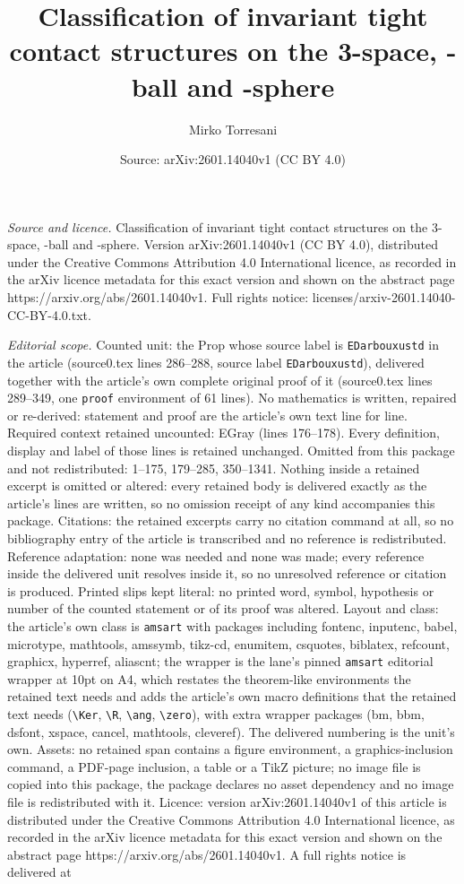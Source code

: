 \documentclass[10pt,a4paper]{amsart}
\title[Classification of invariant tight contact structures on the ]{Classification of invariant tight contact structures on the 3-space, -ball and -sphere}
\author{Mirko Torresani}
\date{Source: arXiv:2601.14040v1 (CC BY 4.0)}
\begin{document}
\maketitle

\noindent\emph{Source and licence.} Classification of invariant tight contact structures on the 3-space, -ball and -sphere. Version arXiv:2601.14040v1 (CC BY 4.0), distributed under the Creative Commons Attribution 4.0 International licence, as recorded in the arXiv licence metadata for this exact version and shown on the abstract page https://arxiv.org/abs/2601.14040v1. Full rights notice: licenses/arxiv-2601.14040-CC-BY-4.0.txt.\par\smallskip

\noindent\textit{Editorial scope.} Counted unit: the Prop whose source label is \texttt{EDarbouxustd} in the article (source0.tex lines 286--288, source label \texttt{EDarbouxustd}), delivered together with the article's own complete original proof of it (source0.tex lines 289--349, one \texttt{proof} environment of 61 lines). No mathematics is written, repaired or re-derived: statement and proof are the article's own text line for line. Required context retained uncounted: EGray (lines 176--178). Every definition, display and label of those lines is retained unchanged. Omitted from this package and not redistributed: 1--175, 179--285, 350--1341. Nothing inside a retained excerpt is omitted or altered: every retained body is delivered exactly as the article's lines are written, so no omission receipt of any kind accompanies this package. Citations: the retained excerpts carry no citation command at all, so no bibliography entry of the article is transcribed and no reference is redistributed. Reference adaptation: none was needed and none was made; every reference inside the delivered unit resolves inside it, so no unresolved reference or citation is produced. Printed slips kept literal: no printed word, symbol, hypothesis or number of the counted statement or of its proof was altered. Layout and class: the article's own class is \texttt{amsart} with packages including fontenc, inputenc, babel, microtype, mathtools, amssymb, tikz-cd, enumitem, csquotes, biblatex, refcount, graphicx, hyperref, aliascnt; the wrapper is the lane's pinned \texttt{amsart} editorial wrapper at 10pt on A4, which restates the theorem-like environments the retained text needs and adds the article's own macro definitions that the retained text needs (\texttt{\textbackslash Ker}, \texttt{\textbackslash R}, \texttt{\textbackslash ang}, \texttt{\textbackslash zero}), with extra wrapper packages (bm, bbm, dsfont, xspace, cancel, mathtools, cleveref). The delivered numbering is the unit's own. Assets: no retained span contains a figure environment, a graphics-inclusion command, a PDF-page inclusion, a table or a TikZ picture; no image file is copied into this package, the package declares no asset dependency and no image file is redistributed with it. Licence: version arXiv:2601.14040v1 of this article is distributed under the Creative Commons Attribution 4.0 International licence, as recorded in the arXiv licence metadata for this exact version and shown on the abstract page https://arxiv.org/abs/2601.14040v1. A full rights notice is delivered at 
\end{document}
